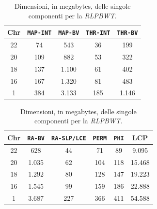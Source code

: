 \begin{table}
  \centering
  \caption{Dimensioni, in megabytes, delle singole componenti per la
    \textit{RLPBWT}.} 
  \label{tab:comp}
  \begin{tabular}{c||c|c|c|c}
    Chr & \texttt{MAP-INT} & \texttt{MAP-BV} & \texttt{THR-INT}
    & \texttt{THR-BV}  \\ \hline
    22 & 74 & 543 & 36 & 199\\ \hline
    20 & 109 & 882 & 53 & 322\\ \hline
    18 & 137 & 1.100 & 61 & 402\\ \hline
    16 & 167 & 1.320 & 81 & 483\\ \hline
    1 & 384 & 3.133 & 185 & 1.146
  \end{tabular}
   \vspace{+3mm}
 \vspace{+1mm}
  \begin{tabular}{c||c|c|c|c|c}
    Chr & \texttt{RA-BV} & \texttt{RA-SLP/LCE} & \texttt{PERM} & \texttt{PHI}
    & LCP\\
    \hline
    22 & 628 & 44 & 71 & 89 & 9.095\\ \hline
    20 & 1.035 & 62 & 104 & 118 & 15.468 \\ \hline
    18 & 1.292 & 80 & 128 & 147 & 19.223 \\ \hline
    16 & 1.545 & 99 & 159 & 186 & 22.888\\ \hline
    1 & 3.687 & 227 & 366 & 411 & 54.588
  \end{tabular}
\end{table}
